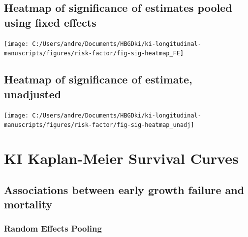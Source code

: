 \documentclass[9pt,]{book}
\begin{document}
\section{Heatmap of significance of estimates pooled using fixed
effects}\label{heatmap-of-significance-of-estimates-pooled-using-fixed-effects}

\texttt{[image: C:/Users/andre/Documents/HBGDki/ki-longitudinal-manuscripts/figures/risk-factor/fig-sig-heatmap\_FE]}

\section{Heatmap of significance of estimate,
unadjusted}\label{heatmap-of-significance-of-estimate-unadjusted}

\texttt{[image: C:/Users/andre/Documents/HBGDki/ki-longitudinal-manuscripts/figures/risk-factor/fig-sig-heatmap\_unadj]}

\chapter{KI Kaplan-Meier Survival Curves}\label{survival}

\raggedright

\section{Associations between early growth failure and
mortality}\label{associations-between-early-growth-failure-and-mortality}

\subsection{Random Effects Pooling}\label{random-effects-pooling}
\end{document}
